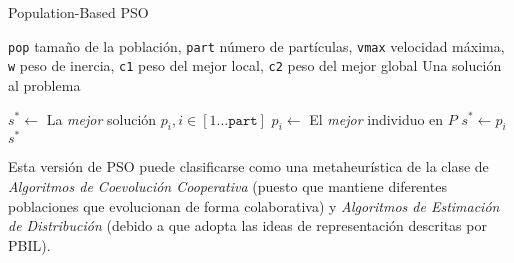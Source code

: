 \begin{algorithm}
\caption{Population-Based PSO}
\label{pbpso-alg}
\begin{algorithmic}[1]

\Require \texttt{pop} tamaño de la población,
	\texttt{part} número de partículas,
	\texttt{vmax} velocidad máxima,
	\texttt{w} peso de inercia,
	\texttt{c1} peso del mejor local,
	\texttt{c2} peso del mejor global
\Ensure Una solución al problema

\EndFor
\State $s^* \gets$ La \emph{mejor} solución $p_i, i \in [1 \dots \texttt{part}]$
			\State $p_i \gets$ El \emph{mejor} individuo en $P$
				\State $s^* \gets p_i$
			\EndIf
		\EndIf
	\EndFor
\EndWhile
\State \Return $s^*$

\end{algorithmic}
\end{algorithm}

Esta versión de PSO puede clasificarse como una metaheurística de la clase de \emph{Algoritmos de Coevolución Cooperativa} \cite{Derrac:2009:FSU:1574827.1574906} (puesto que mantiene diferentes poblaciones que evolucionan de forma colaborativa) y \emph{Algoritmos de Estimación de Distribución} (debido a que adopta las ideas de representación descritas por PBIL).
